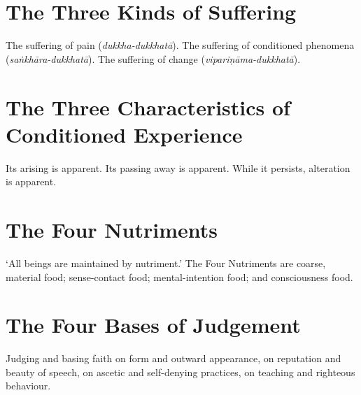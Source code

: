 \ifhandbookedition
\vspace*{-\baselineskip}
\fi

\section*{The Three Kinds of Suffering}

The suffering of pain (\emph{dukkha-dukkhatā}).
The suffering of conditioned phenomena (\emph{saṅkhāra-dukkhatā}).
The suffering of change (\emph{vipariṇāma-dukkhatā}).


\ifhandbookedition
\vspace*{-\baselineskip}
\fi

\section*{The Three Characteristics of Conditioned Experience}

Its arising is apparent. Its passing away is apparent. While it persists,
alteration is apparent.


\ifhandbookedition
\vspace*{-1.1\baselineskip}
\enlargethispage{\baselineskip}
\fi

\section*{The Four Nutriments}

‘All beings are maintained by nutriment.’ The Four Nutriments are coarse,
material food; sense-contact food; mental-intention food; and consciousness
food.


\ifhandbookedition
\vspace*{-1.1\baselineskip}
\fi

\section*{The Four Bases of Judgement}

Judging and basing faith on form and outward appearance, on reputation and
beauty of speech, on ascetic and self-denying practices, on teaching and
righteous behaviour.


\ifhandbookedition
\vspace*{-1.1\baselineskip}
\fi

